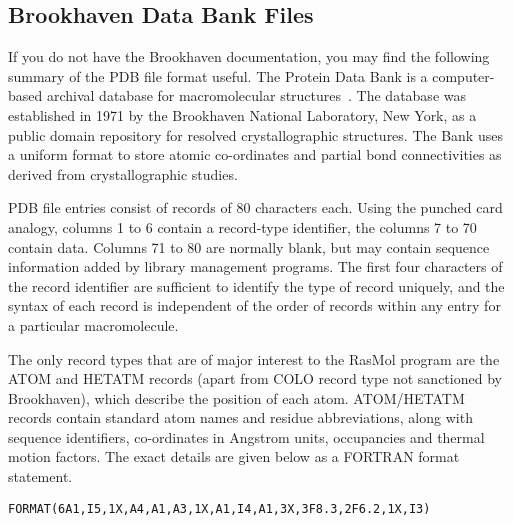 \subsection{Brookhaven Data Bank Files}
\label{Brookhaven}

If you do not have the Brookhaven documentation, you may find the following
summary of the PDB file format useful. The Protein Data Bank is a computer-%
based archival database for macromolecular structures~\cite{Bernstein77}.
The database was established in 1971 by the Brookhaven National Laboratory,
New York, as a public domain repository for resolved crystallographic
structures. The Bank uses a uniform format to store atomic co-ordinates 
and partial bond connectivities as derived from crystallographic studies. 

PDB file entries consist of records of 80 characters each. Using the
punched card analogy, columns 1 to 6 contain a record-type identifier,
the columns 7 to 70 contain data. Columns 71 to 80 are normally blank,
but may contain sequence information added by library management 
programs. The first four characters of the record identifier are 
sufficient to identify the type of record uniquely, and the syntax of
each record is independent of the order of records within any entry
for a particular macromolecule.

The only record types that are of major interest to the RasMol program
are the ATOM and HETATM records (apart from COLO record type not
sanctioned by Brookhaven), which describe the position of each
atom. ATOM/HETATM records contain standard atom names and residue
abbreviations, along with sequence identifiers, co-ordinates
in Angstrom units, occupancies and thermal motion factors. The exact
details are given below as a FORTRAN format statement.

\begin{center}
{\tt FORMAT(6A1,I5,1X,A4,A1,A3,1X,A1,I4,A1,3X,3F8.3,2F6.2,1X,I3)}
\end{center}

